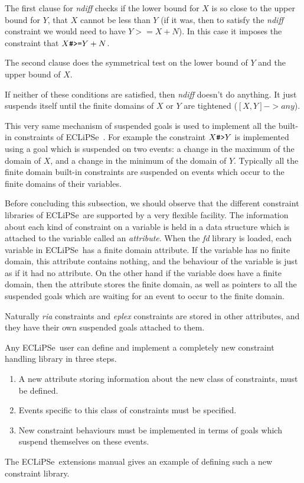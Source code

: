 \documentclass[a4wide]{article}
\newcommand{\ECL}{\mbox{ECLiPSe\ }{\hspace{1mm}}}
\begin{document}
The first clause for {\em ndiff} checks if the lower bound for $X$ is
so close to the upper bound for $Y$, that $X$ cannot be less than $Y$
(if it was, then to satisfy the {\em ndiff} constraint we would need to
have $Y>=X+N$).
In this case it imposes the constraint that $X \verb0#>=0 Y+N$.

The second clause does the symmetrical test on the lower bound of $Y$
and the upper bound of $X$.

If neither of these conditions are satisfied, then {\em ndiff} doesn't
do anything.
It just suspends itself until the finite domains of $X$ or $Y$ are
tightened ($[X,Y] -> any$).

This very same mechanism of suspended goals is used to implement all
the built-in constraints of \ECL.
For example the constraint $X \verb0#>0 Y$ is implemented using a
goal which is suspended on two events: 
a change in the maximum of the domain of $X$,
and a change in the minimum of the domain of $Y$. 
Typically all the finite domain built-in constraints are suspended on
events which occur to the finite domains of their variables.

Before concluding this subsection, we should observe that the
different constraint libraries of \ECL are supported by a very
flexible facility.
The information about each kind of constraint on a variable is held in
a data structure which is attached to the variable called an
{\em attribute}.
When the {\em fd} library is loaded, each variable in \ECL has a
finite domain attribute.
If the variable has no finite domain, this attribute contains nothing,
and the behaviour of the variable is just as if it had no attribute.
On the other hand if the variable does have a finite domain, then the
attribute stores the finite domain, as well as pointers to all the
suspended goals which are waiting for an event to occur to the finite
domain.

Naturally {\em ria} constraints and {\em eplex} constraints are stored
in other attributes, and they have their own suspended goals attached
to them.

Any \ECL user can define and implement a completely new constraint
handling library in three steps.  
\begin{enumerate}
\item
A new attribute storing information about
the new class of constraints, must be defined.
\item
Events specific to this class of constraints must be specified.
\item
New constraint behaviours must be implemented in terms of
goals which suspend themselves on these events.
\end{enumerate}
The \ECL extensions  manual \cite{eclipseext} gives an example of
defining such a new constraint 
library. 
\end{document}
